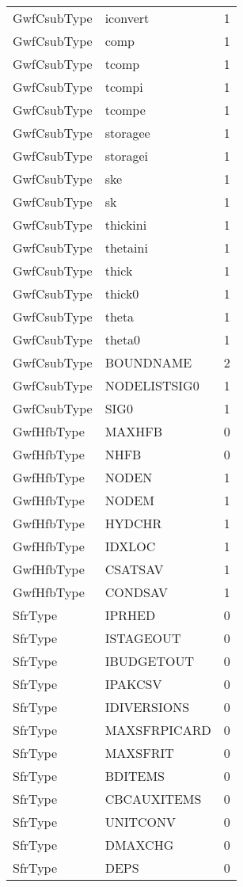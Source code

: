 \begin{longtable}{p{6cm} p{4cm} p{2cm} }
GwfCsubType &  iconvert & 1 \\ 
GwfCsubType &  comp & 1 \\ 
GwfCsubType &  tcomp & 1 \\ 
GwfCsubType &  tcompi & 1 \\ 
GwfCsubType &  tcompe & 1 \\ 
GwfCsubType &  storagee & 1 \\ 
GwfCsubType &  storagei & 1 \\ 
GwfCsubType &  ske & 1 \\ 
GwfCsubType &  sk & 1 \\ 
GwfCsubType &  thickini & 1 \\ 
GwfCsubType &  thetaini & 1 \\ 
GwfCsubType &  thick & 1 \\ 
GwfCsubType &  thick0 & 1 \\ 
GwfCsubType &  theta & 1 \\ 
GwfCsubType &  theta0 & 1 \\ 
GwfCsubType & BOUNDNAME & 2 \\ 
GwfCsubType &  NODELISTSIG0 & 1 \\ 
GwfCsubType &  SIG0 & 1 \\ 
GwfHfbType &  MAXHFB & 0 \\ 
GwfHfbType &  NHFB & 0 \\ 
GwfHfbType &  NODEN & 1 \\ 
GwfHfbType &  NODEM & 1 \\ 
GwfHfbType &  HYDCHR & 1 \\ 
GwfHfbType &  IDXLOC & 1 \\ 
GwfHfbType &  CSATSAV & 1 \\ 
GwfHfbType &  CONDSAV & 1 \\ 
SfrType &  IPRHED & 0 \\ 
SfrType &  ISTAGEOUT & 0 \\ 
SfrType &  IBUDGETOUT & 0 \\ 
SfrType &  IPAKCSV & 0 \\ 
SfrType &  IDIVERSIONS & 0 \\ 
SfrType &  MAXSFRPICARD & 0 \\ 
SfrType &  MAXSFRIT & 0 \\ 
SfrType &  BDITEMS & 0 \\ 
SfrType &  CBCAUXITEMS & 0 \\ 
SfrType &  UNITCONV & 0 \\ 
SfrType &  DMAXCHG & 0 \\ 
SfrType &  DEPS & 0 \\ 

\end{longtable}

